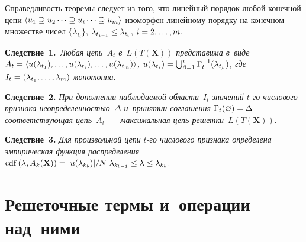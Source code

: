 \begin{multicols}{2}
     \smallskip
     
     Справедливость тео\-ре\-мы следует из того, что линейный порядок любой 
конечной цепи $\langle u_1\hm \supseteq u_2\cdots \supseteq u_i\cdots \supseteq 
u_m\rangle$ изоморфен линейному порядку на конечном множестве чисел 
$\{\lambda_{t_i}\}$, $\lambda_{t_{i-1}} \hm\leq \lambda_{t_i}$, $i\hm=  
2, \ldots , m$.
     
     \smallskip
     
     \noindent
     \textbf{Следствие~1.}\ \textit{Любая цепь~$A_t$ в~$L(T(\mathbf{X}))$ 
пред\-ста\-ви\-ма в~виде $A_t\hm= \langle u(\lambda_{t_1}), \ldots , 
u(\lambda_{t_i}),\ldots , u(\lambda_{t_m})\rangle$, $u(\lambda_{t_i})\hm= 
\mathop{\bigcup}_{\beta=1}^i \Gamma^{-1}_t(\lambda_{t_\beta})$, где 
$I_t\hm= (\lambda_{t_1}, \ldots , \lambda_m)$ монотонна}.
     
     \smallskip
     
     \noindent
     \textbf{Следствие~2.} \textit{При дополнении наблюда\-емой 
об\-ласти~$I_t$ значений $t$-го чис\-ло\-во\-го при\-зна\-ка 
не\-опре\-де\-лен\-ностью~$\Delta$ и~принятии со\-гла\-ше\-ния 
$\Gamma_t(\varnothing)\hm=\Delta$ со\-от\-вет\-ст\-ву\-ющая цепь~$A_t$~--- 
максимальная цепь решетки}~$L(T(\mathbf{X}))$. 
     
     \smallskip
     
     \noindent
\textbf{Следствие~3.} \textit{Для произвольной цепи} $t$\textit{-го чис\-ло\-во\-го 
при\-зна\-ка определена эмпирическая функция распределения}  
$\mathrm{cdf}\,(\lambda, A_k(\mathbf{X})) \hm= \vert u(\lambda_{k_b})\vert /N \big\vert \lambda_{k_{b-1}} \hm\leq \lambda\hm\leq \lambda_{k_b}$. 

\section{Решеточные термы и~операции над~ними}


\end{multicols}
